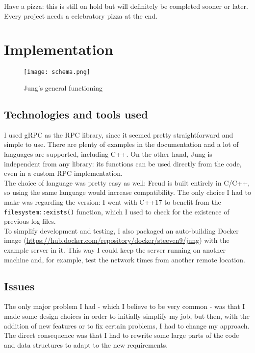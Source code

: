         Have a pizza: this is still on hold but will definitely be completed sooner or later. Every project needs
        a celebratory pizza at the end.
        

\chapter{Implementation}

    \begin{figure}[H]
        \centering
        \texttt{[image: schema.png]}
        \caption{Jung's general functioning}
        \label{fig:schema}
    \end{figure}
    

    \section{Technologies and tools used}

        I used gRPC \cite{gRPCdocs} as the RPC library, since it seemed pretty straightforward and simple
        to use. There are plenty of examples in the documentation and a lot of languages are supported,
        including C++. On the other hand, Jung is independent from any library:
        its functions can be used directly from the code, even in a custom RPC implementation.\\

        The choice of language was pretty easy as well: Freud is built entirely in C/C++, so using the same
        language would increase compatibility. The only choice I had to make was regarding the version:
        I went with C++17 to benefit from the \texttt{filesystem::exists()} function, which I used to check
        for the existence of previous log files.\\

        To simplify development and testing, I also packaged an auto-building Docker image 
        (\url{https://hub.docker.com/repository/docker/steeven9/jung}) with the example server in it.
        This way I could keep the server running on another machine and, for example, test the network times
        from another remote location.


    \section{Issues}\label{sec:issues}

        The only major problem I had - which I believe to be very common - was that I made some
        design choices in order to initially simplify my job, but then, with the addition of
        new features or to fix certain problems, I had to change my approach. The direct consequence was that I
        had to rewrite some large parts of the code and data structures to adapt to the new requirements.\\
        
